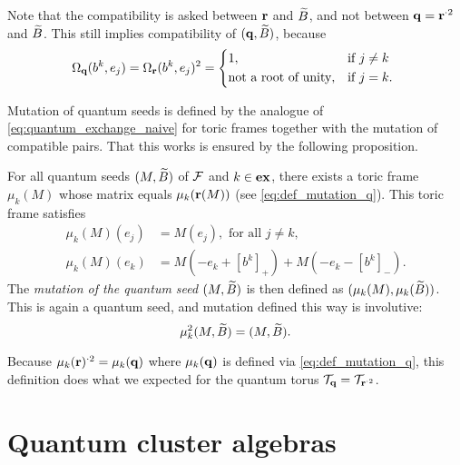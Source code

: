 \begin{remark}
	Note that the compatibility is asked between $\mathbf{r}$ and $\widetilde{B}$, and not between $\mathbf{q} = \mathbf{r}^{\cdot 2}$ and $\widetilde{B}$. This still implies compatibility of $(\mathbf{q}, \widetilde{B})$, because
	\begin{equation*}
		\Omega_\bbq(b^k, e_j) = \Omega_\bbr(b^k, e_j)^2 = \begin{dcases*}
			1,                          & if $j \neq k$ \\
			\text{not a root of unity}, & if $j = k$.
		\end{dcases*}
	\end{equation*}
\end{remark}

Mutation of quantum seeds is defined by the analogue of
\cref{eq:quantum_exchange_naive} for toric frames together with the mutation of
compatible pairs. That this works is ensured by the following proposition.
\begin{proposition}\label{prop:formula_for_mutation}

	For all quantum seeds $(M, \widetilde{B})$ of $\mathcal{F}$ and $k\in \mathbf{ex}$, there exists a toric frame
	$\mu_k(M)$ whose matrix equals $\mu_k(\mathbf{r}(M))$ (see \cref{eq:def_mutation_q}). This
	toric frame satisfies
	\begin{align*}
		\mu_k(M)(e_j) & = M(e_j), \text{ for all } j \neq k,         \\
		\mu_k(M)(e_k) & = M(-e_k + [b^k]_{+}) + M(-e_k - [b^k]_{-}).
	\end{align*}
	The \emph{mutation of the quantum seed} $(M, \widetilde{B})$ is then
	defined as $(\mu_k(M), \mu_k(\widetilde{B}))$. This is again a quantum seed, and mutation defined
	this way is involutive:
	\begin{equation*}
		\mu^2_k (M, \widetilde{B}) = (M, \widetilde{B}).
	\end{equation*}
\end{proposition}
\begin{remark}

	Because $\mu_k(\mathbf{r})^{\cdot 2} = \mu_k(\mathbf{q})$ where $\mu_k(\mathbf{q})$ is defined via
	\cref{eq:def_mutation_q}, this definition does what we expected for the quantum torus
	$\mathcal{T}_{\mathbf{q}} = \mathcal{T}_{\mathbf{r}^{\cdot 2}}$.
\end{remark}

\section{Quantum cluster algebras}

